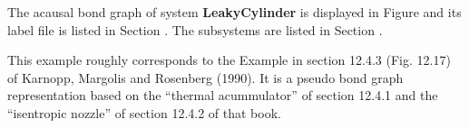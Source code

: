 

   The acausal bond graph of system \textbf{LeakyCylinder} is
   displayed in Figure  and its label
   file is listed in Section .
   The subsystems are listed in Section .

This example roughly corresponds to the Example in section 12.4.3
(Fig. 12.17) of Karnopp, Margolis and Rosenberg (1990). It is a pseudo bond
graph representation based on the ``thermal acummulator'' of  section
12.4.1 and the ``isentropic nozzle'' of section 12.4.2 of that book.





